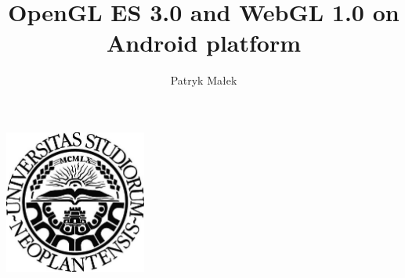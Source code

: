 \documentclass[a4paper,11pt]{article}
\begin{document}
\label{Title} 
\title{OpenGL ES 3.0 and WebGL 1.0 on Android platform \vspace{1pc}}
\author{Patryk Małek \vspace{-0.7pc}}
\date{}%
\maketitle
\thispagestyle{empty}


\vspace{4pc}
\centerline{
\includegraphics[width=0.35\textwidth,height=0.35\textheight,keepaspectratio]{NoviSadLogoGray.jpg}
}
\vspace{5pc}
\end{document}
